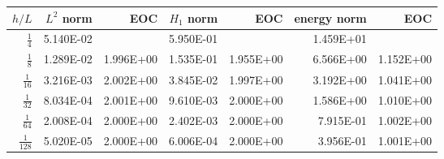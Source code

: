 \begin{table}
  \begin{tabular}{rrrrrrr}
    \hline\hline
    \textbf{$h/{L} $} & \textbf{$L^2$ norm} & \textbf{EOC} & \textbf{$H_1$ norm} & \textbf{EOC} & \textbf{energy norm} & \textbf{EOC} \\\hline
    $\frac{1}{4}$ & 5.140E-02 &  & 5.950E-01 &  & 1.459E+01 &  \\
    $\frac{1}{8}$ & 1.289E-02 & 1.996E+00 & 1.535E-01 & 1.955E+00 & 6.566E+00 & 1.152E+00 \\
    $\frac{1}{16}$ & 3.216E-03 & 2.002E+00 & 3.845E-02 & 1.997E+00 & 3.192E+00 & 1.041E+00 \\
    $\frac{1}{32}$ & 8.034E-04 & 2.001E+00 & 9.610E-03 & 2.000E+00 & 1.586E+00 & 1.010E+00 \\
    $\frac{1}{64}$ & 2.008E-04 & 2.000E+00 & 2.402E-03 & 2.000E+00 & 7.915E-01 & 1.002E+00 \\
    $\frac{1}{128}$ & 5.020E-05 & 2.000E+00 & 6.006E-04 & 2.000E+00 & 3.956E-01 & 1.001E+00 \\\hline\hline
  \end{tabular}
\end{table}
